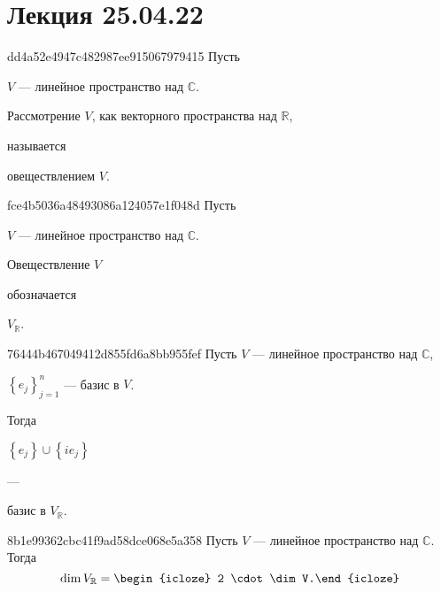 \section{Лекция 25.04.22}
\begin{note}{dd4a52e4947c482987ee915067979415}
    Пусть \begin{icloze}{3}\({ V }\) --- линейное пространство над \({ \mathbb C }\).\end{icloze}
    \begin{icloze}{1}Рассмотрение \({ V }\), как векторного пространства над \({ \mathbb R }\),\end{icloze} называется \begin{icloze}{2}овеществлением \({ V }\).\end{icloze}
\end{note}

\begin{note}{fce4b5036a48493086a124057e1f048d}
    Пусть \begin{icloze}{3}\({ V }\) --- линейное пространство над \({ \mathbb C }\).\end{icloze}
    \begin{icloze}{1}Овеществление  \({ V }\)\end{icloze} обозначается \begin{icloze}{2}\({ V_{\mathbb R} }\).\end{icloze}
\end{note}

\begin{note}{76444b467049412d855fd6a8bb955fef}
    Пусть \({ V }\) --- линейное пространство над \({ \mathbb C }\),\: \begin{icloze}{3}\({ \left\{ e_j \right\}_{j = 1}^{n} }\) --- базис в \({ V }\).\end{icloze}
    Тогда \begin{icloze}{1}\({ \left\{ e_j \right\} \cup \left\{ ie_j \right\} }\)\end{icloze} --- \begin{icloze}{2}базис в \({ V_{\mathbb R} }\).\end{icloze}
\end{note}

\begin{note}{8b1e99362cbc41f9ad58dce068e5a358}
    Пусть \({ V }\) --- линейное пространство над \({ \mathbb C }\). Тогда
    \[
        \dim V_{\mathbb R} = \begin{icloze}{1}2 \cdot \dim V.\end{icloze}
    \]
\end{note}

